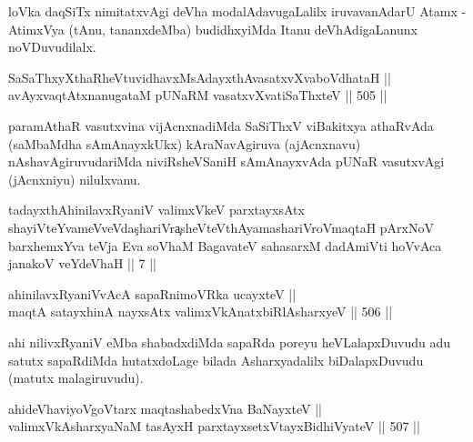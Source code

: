 \begin{artha}
loVka daqSiTx nimitatxvAgi deVha modalAdavugaLalilx iruvavanAdarU
Atamx - AtimxVya (tAnu, tananxdeMba) budidhxyiMda Itanu
deVhAdigaLanunx noVDuvudilalx.
\end{artha}


\begin{shl}
SaSaThxyXthaRheVtuvidhavxMsAdayxthAvasatxvXvaboVdhataH || \\
avAyxvaqtAtxnanugataM pUNaRM vasatxvXvatiSaThxteV \hfill || 505 ||  
\end{shl}

\begin{artha}
paramAthaR vasutxvina vijAcnxnadiMda SaSiThxV viBakitxya athaRvAda
(saMbaMdha sAmAnayxkUkx) kAraNavAgiruva (ajAcnxnavu)
nAshavAgiruvudariMda niviRsheVSaniH sAmAnayxvAda pUNaR vasutxvAgi
(jAcnxniyu) nilulxvanu.
\end{artha}

\begin{kandikeshl}
tadayxthA\s hinilavxRyaniV valimxVkeV parxtayxsAtx shayiVteYvameVveVda\c  shariVra\c\break  sheVteV\s thAyamashariVroV\s maqtaH pArxNoV barxhemxYva teVja Eva soV\s haM BagavateV sahasarxM dadAmiVti hoVvAca janakoV veYdeVhaH || 7 ||
\end{kandikeshl}


\begin{shl}
ahinilavxRyaniVvAcA sapaRnimoVRka ucayxteV || \\
maqtA satayxhinA nayxsAtx valimxVkAnatxbiRlAsharxyeV \hfill || 506 ||
\end{shl}

\begin{artha}
ahi nilivxRyaniV eMba shabadxdiMda sapaRda poreyu heVLalapxDuvudu adu
satutx sapaRdiMda hutatxdoLage bilada Asharxyadalilx biDalapxDuvudu
(matutx malagiruvudu).
\end{artha}

\begin{shl}
ahideVhaviyoVgoV\s tarx maqtashabedxVna BaNayxteV || \\
valimxVkAsharxyaNaM tasAyxH parxtayxsetxVtayxBidhiVyateV \hfill || 507 ||  
\end{shl}

